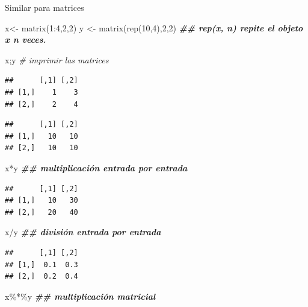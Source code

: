 \documentclass[
  12pt,
]{book}
\newenvironment{Shaded}{\begin{snugshade}}{\end{snugshade}}
\newcommand{\CommentTok}[1]{\textcolor[rgb]{0.56,0.35,0.01}{\textit{#1}}}
\newcommand{\DecValTok}[1]{\textcolor[rgb]{0.00,0.00,0.81}{#1}}
\newcommand{\DocumentationTok}[1]{\textcolor[rgb]{0.56,0.35,0.01}{\textbf{\textit{#1}}}}
\newcommand{\FunctionTok}[1]{\textcolor[rgb]{0.00,0.00,0.00}{#1}}
\newcommand{\NormalTok}[1]{#1}
\newcommand{\OtherTok}[1]{\textcolor[rgb]{0.56,0.35,0.01}{#1}}
\newcommand{\SpecialCharTok}[1]{\textcolor[rgb]{0.00,0.00,0.00}{#1}}
\begin{document}
Similar para matrices

\begin{Shaded}
\begin{Highlighting}[]
\NormalTok{x}\OtherTok{\textless{}{-}} \FunctionTok{matrix}\NormalTok{(}\DecValTok{1}\SpecialCharTok{:}\DecValTok{4}\NormalTok{,}\DecValTok{2}\NormalTok{,}\DecValTok{2}\NormalTok{) }
\NormalTok{y }\OtherTok{\textless{}{-}} \FunctionTok{matrix}\NormalTok{(}\FunctionTok{rep}\NormalTok{(}\DecValTok{10}\NormalTok{,}\DecValTok{4}\NormalTok{),}\DecValTok{2}\NormalTok{,}\DecValTok{2}\NormalTok{)  }\DocumentationTok{\#\# rep(x, n) repite el objeto x n veces.}

\NormalTok{x;y }\CommentTok{\# imprimir las matrices}
\end{Highlighting}
\end{Shaded}

\begin{verbatim}
##      [,1] [,2]
## [1,]    1    3
## [2,]    2    4
\end{verbatim}

\begin{verbatim}
##      [,1] [,2]
## [1,]   10   10
## [2,]   10   10
\end{verbatim}

\begin{Shaded}
\begin{Highlighting}[]
\NormalTok{x}\SpecialCharTok{*}\NormalTok{y }\DocumentationTok{\#\# multiplicación entrada por entrada}
\end{Highlighting}
\end{Shaded}

\begin{verbatim}
##      [,1] [,2]
## [1,]   10   30
## [2,]   20   40
\end{verbatim}

\begin{Shaded}
\begin{Highlighting}[]
\NormalTok{x}\SpecialCharTok{/}\NormalTok{y }\DocumentationTok{\#\# división entrada por entrada}
\end{Highlighting}
\end{Shaded}

\begin{verbatim}
##      [,1] [,2]
## [1,]  0.1  0.3
## [2,]  0.2  0.4
\end{verbatim}

\begin{Shaded}
\begin{Highlighting}[]
\NormalTok{x}\SpecialCharTok{\%*\%}\NormalTok{y }\DocumentationTok{\#\# multiplicación matricial }
\end{Highlighting}
\end{Shaded}
\end{document}
